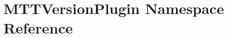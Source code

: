 \hypertarget{namespaceMTTVersionPlugin}{\section{M\-T\-T\-Version\-Plugin Namespace Reference}
\label{namespaceMTTVersionPlugin}
}
